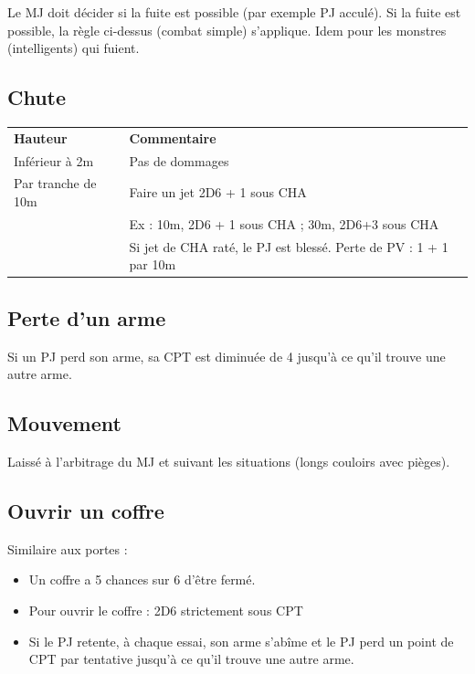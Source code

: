 \documentclass[a4paper, 11pt, twoside]{article}
\begin{document}
Le MJ doit décider si la fuite est possible (par exemple PJ acculé). Si la fuite est possible, la règle ci-dessus (combat simple) s'applique. Idem pour les monstres (intelligents) qui fuient.

\subsection{Chute}
\label{sec:orgb577ca8}

\begin{longtable}{ll}
\textbf{Hauteur} & \textbf{Commentaire}\\
Inférieur à 2m & Pas de dommages\\
Par tranche de 10m & Faire un jet 2D6 + 1 sous CHA\\
 & Ex : 10m, 2D6 + 1 sous CHA ; 30m, 2D6+3 sous CHA\\
 & Si jet de CHA raté, le PJ est blessé. Perte de PV : 1 + 1 par 10m\\
\end{longtable}

\subsection{Perte d'un arme}
\label{sec:org8ceda78}

Si un PJ perd son arme, sa CPT est diminuée de 4 jusqu'à ce qu'il trouve une autre arme.

\subsection{Mouvement}
\label{sec:org07ba2f1}

Laissé à l'arbitrage du MJ et suivant les situations (longs couloirs avec pièges).

\subsection{Ouvrir un coffre}
\label{sec:orgf419e84}

Similaire aux portes :
\begin{itemize}
\item Un coffre a 5 chances sur 6 d'être fermé.
\item Pour ouvrir le coffre : 2D6 strictement sous CPT
\item Si le PJ retente, à chaque essai, son arme s'abîme et le PJ perd un point de CPT par tentative jusqu'à ce qu'il trouve une autre arme.
\end{itemize}
\end{document}
